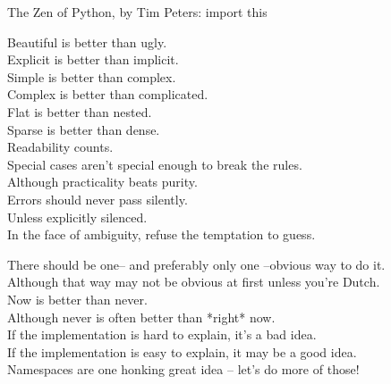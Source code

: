 \documentclass[11pt]{beamer}
\begin{document}
		\begin{frame}{
			The Zen of Python, by Tim Peters: import this}
    			\fontsize{10pt}{10pt}\selectfont
			
			\begin{minipage}{0.45\linewidth}
			Beautiful is better than ugly.\\
			Explicit is better than implicit.\\
			Simple is better than complex.\\
			Complex is better than complicated.\\
			Flat is better than nested.\\
			Sparse is better than dense.\\
			Readability counts.\\
			Special cases aren't special enough to break the rules.\\
			Although practicality beats purity.\\
			Errors should never pass silently.\\
			Unless explicitly silenced.\\
			In the face of ambiguity, refuse the temptation to guess.\\
			\end{minipage}
			\hspace{0.5cm}
			\begin{minipage}{0.45\linewidth}
			There should be one-- and preferably only one --obvious way to do it.\\
			Although that way may not be obvious at first unless you're Dutch.\\
			Now is better than never.\\
			Although never is often better than *right* now.\\
			If the implementation is hard to explain, it's a bad idea.\\
			If the implementation is easy to explain, it may be a good idea.\\
			Namespaces are one honking great idea -- let's do more of those!\\
			\end{minipage}
		\end{frame}
		
\end{document}
